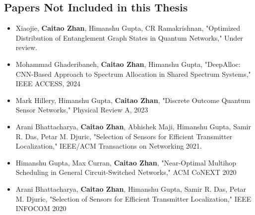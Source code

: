 \subsection*{Papers Not Included in this Thesis}
\begin{itemize}

    \item Xiaojie, \textbf{Caitao Zhan}, Himanshu Gupta, CR Ramakrishnan, "Optimized Distribution of Entanglement Graph States in Quantum Networks," Under review.

    \item Mohammad Ghaderibaneh, \textbf{Caitao Zhan}, Himanshu Gupta, "DeepAlloc: CNN-Based Approach to Spectrum Allocation in Shared Spectrum Systems," IEEE ACCESS, 2024

    \item Mark Hillery, Himanshu Gupta, \textbf{Caitao Zhan}, "Discrete Outcome Quantum Sensor Networks," Physical Review A, 2023

    \item Arani Bhattacharya, \textbf{Caitao Zhan}, Abhishek Maji, Himanshu Gupta, Samir R. Das, Petar M. Djuric, "Selection of Sensors for Efficient Transmitter Localization," IEEE/ACM Transactions on Networking 2021.

    \item Himanshu Gupta, Max Curran, \textbf{Caitao Zhan}, "Near-Optimal Multihop Scheduling in General Circuit-Switched Networks," ACM CoNEXT 2020
    
    \item Arani Bhattacharya, \textbf{Caitao Zhan}, Himanshu Gupta, Samir R. Das, Petar M. Djuric, "Selection of Sensors for Efficient Transmitter Localization," IEEE INFOCOM 2020
  
\end{itemize}

